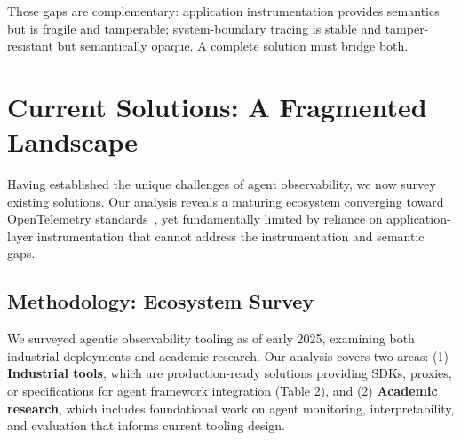 \documentclass[sigplan,screen,9pt]{acmart}
\begin{document}
These gaps are complementary: application instrumentation provides semantics but is fragile and tamperable; system-boundary tracing is stable and tamper-resistant but semantically opaque. A complete solution must bridge both.

\section{Current Solutions: A Fragmented Landscape}

Having established the unique challenges of agent observability, we now survey existing solutions. Our analysis reveals a maturing ecosystem converging toward OpenTelemetry standards~\cite{otelgenai,Liu2025OTel}, yet fundamentally limited by reliance on application-layer instrumentation that cannot address the instrumentation and semantic gaps.

\subsection{Methodology: Ecosystem Survey}

We surveyed agentic observability tooling as of early 2025, examining both industrial deployments and academic research. Our analysis covers two areas: (1) \textbf{Industrial tools}, which are production-ready solutions providing SDKs, proxies, or specifications for agent framework integration (Table 2), and (2) \textbf{Academic research}, which includes foundational work on agent monitoring, interpretability, and evaluation that informs current tooling design.
\end{document}
